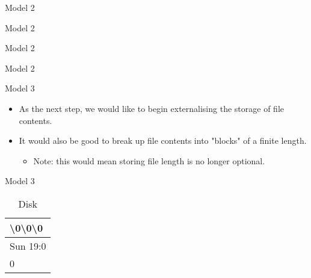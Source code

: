 \documentclass{beamer}
\begin{document}
\begin{frame}{Model 2}
  \begin{figure}
    \centering
    \def\svgwidth{1.1\columnwidth}
    
  \end{figure}
\end{frame}

\begin{frame}{Model 2}
  \begin{figure}
    \centering
    \def\svgwidth{1.1\columnwidth}
    
  \end{figure}
\end{frame}

\begin{frame}{Model 2}
  \begin{figure}
    \centering
    \def\svgwidth{1.1\columnwidth}
    
  \end{figure}
\end{frame}

\begin{frame}{Model 2}
  \begin{figure}
    \centering
    \def\svgwidth{1.1\columnwidth}
    
  \end{figure}
\end{frame}

\begin{frame}{Model 3}
  \begin{itemize}
  \item As the next step, we would like to begin externalising the
    storage of file contents.
  \item It would also be good to break up file contents into "blocks"
    of a finite length.
    \begin{itemize}
    \item Note: this would mean storing file length is no longer
      optional.
    \end{itemize}
  \end{itemize}
\end{frame}

\begin{frame}{Model 3}
  \begin{figure}
    \def\svgwidth{0.7\columnwidth}
    
  \end{figure}
  \begin{table}[]
    \caption{Disk}
    \label{my-label}
    \begin{tabular}{|l|}
      \hline
      \textbackslash0\textbackslash0\textbackslash0   \\ \hline
      Sun 19:0 \\ \hline
      0        \\ \hline
    \end{tabular}
  \end{table}
\end{frame}
\end{document}
